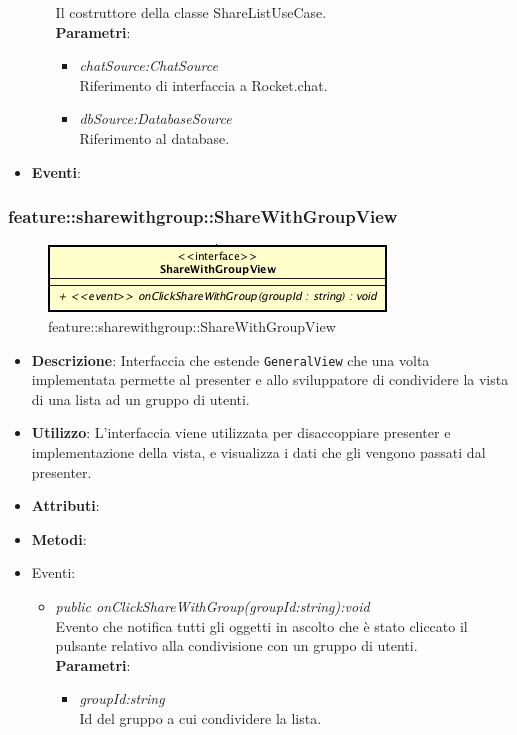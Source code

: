 \begin{itemize}
\begin{itemize}
	Il costruttore della classe ShareListUseCase.
	\\ \textbf{Parametri}: \begin{itemize}
	\item \textit{chatSource:ChatSource}\\
	 	Riferimento di interfaccia a Rocket.chat.
	\item \textit{dbSource:DatabaseSource}\\
		Riferimento al database.
	\end{itemize} 
\end{itemize}
\item \textbf{Eventi}:
\end{itemize}

\subsubsection{feature::sharewithgroup::ShareWithGroupView}

\label{feature::sharewithgroup::ShareWithGroupView}
\begin{figure}[H]
	\centering
	\includegraphics[scale=0.5]{Sezioni/SottosezioniST/img/app/ShareWithGroupView.png}
	\caption{feature::sharewithgroup::ShareWithGroupView}
\end{figure}

\begin{itemize}
\item \textbf{Descrizione}: Interfaccia che estende \texttt{GeneralView} che una volta implementata permette al presenter e allo sviluppatore di condividere la vista di una lista ad un gruppo di utenti.
\item \textbf{Utilizzo}: L'interfaccia viene utilizzata per disaccoppiare presenter e implementazione della vista, e visualizza i dati che gli vengono passati dal presenter.
\item \textbf{Attributi}: 
\item \textbf{Metodi}:
\item{Eventi}:
	\begin{itemize}
	\item \textit{public onClickShareWithGroup(groupId:string):void}\\
	Evento che notifica tutti gli oggetti in ascolto che è stato cliccato il pulsante relativo alla condivisione con un gruppo di utenti.										
	\\ \textbf{Parametri}: \begin{itemize}
			\item \textit{groupId:string}\\
			Id del gruppo a cui condividere la lista.
			\end{itemize} 
	\end{itemize}
\end{itemize}

